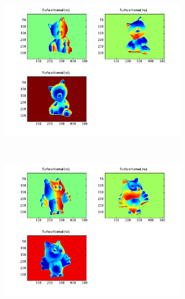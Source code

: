 \documentclass{paper}
\begin{document}
\begin{figure}[h!]
    \begin{subfigure}{0.45\textwidth}
        \includegraphics[width=\textwidth]{results/cat/cat_n_xyz}
    \end{subfigure}
    ~
     \begin{subfigure}{0.45\textwidth}
        \includegraphics[width=\textwidth]{results/owl/owl_n_xyz}
    \end{subfigure}
    

\end{figure}
\end{document}
